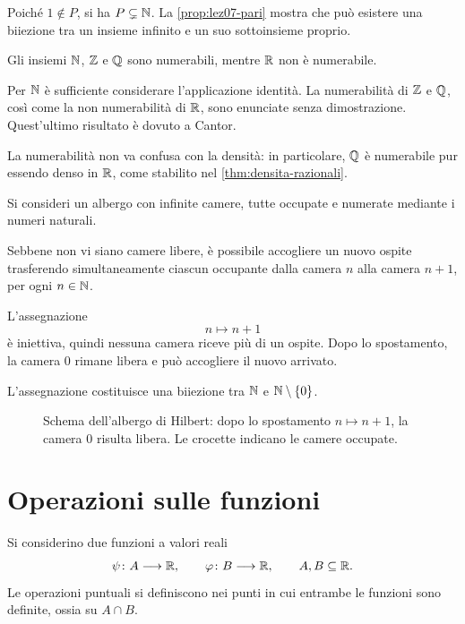 Poiché \(1\notin P\), si ha \(P\subsetneq\mathbb{N}\).
La \cref{prop:lez07-pari} mostra che può esistere
una biiezione tra un insieme infinito e un suo
sottoinsieme proprio.

\begin{proposition}
\label{prop:lez07-insiemi-numerici}
Gli insiemi \(\mathbb{N}\), \(\mathbb{Z}\) e \(\mathbb{Q}\) sono numerabili,
mentre \(\mathbb{R}\) non è numerabile.
\end{proposition}

Per \(\mathbb{N}\) è sufficiente considerare l'applicazione
identità. La numerabilità di \(\mathbb{Z}\) e \(\mathbb{Q}\), così come la
non numerabilità di \(\mathbb{R}\), sono enunciate
senza dimostrazione. Quest'ultimo risultato
è dovuto a Cantor.

La numerabilità non va confusa con la densità:
in particolare, \(\mathbb{Q}\) è numerabile pur essendo
denso in \(\mathbb{R}\), come stabilito nel
\cref{thm:densita-razionali}.

\begin{example}
\label{ex:lez07-hilbert}
Si consideri un albergo con infinite camere, tutte
occupate e numerate mediante i numeri naturali.

Sebbene non vi siano camere libere, è possibile
accogliere un nuovo ospite trasferendo
simultaneamente ciascun occupante dalla camera
\(n\) alla camera \(n+1\), per ogni \(n\in\mathbb{N}\).

L'assegnazione
\[
  n\longmapsto n+1
\]
è iniettiva, quindi nessuna camera riceve più
di un ospite. Dopo lo spostamento, la camera
\(0\) rimane libera e può accogliere il nuovo
arrivato.

L'assegnazione costituisce una biiezione tra
\(\mathbb{N}\) e \(\mathbb{N}\setminus\{0\}\).

\begin{figure}[H]
  \centering
  
  \caption{Schema dell'albergo di Hilbert: dopo lo
  spostamento \(n\mapsto n+1\), la camera \(0\)
  risulta libera. Le crocette indicano le camere
  occupate.}
  \label{fig:lez07-hilbert}
\end{figure}
\end{example}

\section{Operazioni sulle funzioni}
\label{sec:lez07-operazioni}

Si considerino due funzioni a valori reali
\[
  \psi\colon A\longrightarrow\mathbb{R},\qquad
  \varphi\colon B\longrightarrow\mathbb{R},
  \qquad A,B\subseteq\mathbb{R}.
\]
Le operazioni puntuali si definiscono nei punti in cui
entrambe le funzioni sono definite, ossia su \(A\cap B\).

